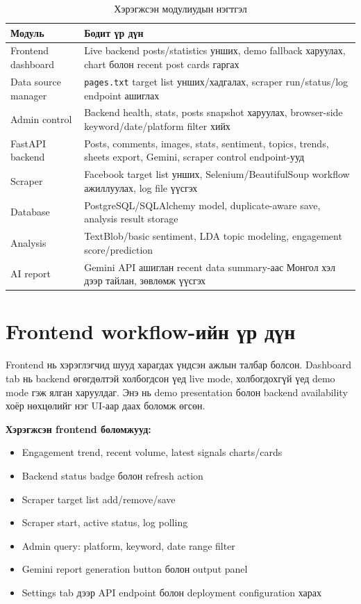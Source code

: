 \documentclass[
12pt,
oneside,
english,
onehalfspacing,
nolistspacing,
headsepline,
]{MUST-Thesis}
\begin{document}
\begin{table}[H]
\centering
\caption{Хэрэгжсэн модулиудын нэгтгэл}
\small
\renewcommand{\arraystretch}{1.25}
\begin{adjustbox}{max width=\textwidth}
\begin{tabular}{|L{3.6cm}|L{9.8cm}|}
\hline
{}\textbf{Модуль} & \textbf{Бодит үр дүн} \\
\hline
Frontend dashboard & Live backend posts/statistics унших, demo fallback харуулах, chart болон recent post cards гаргах \\
\hline
Data source manager & \texttt{pages.txt} target list унших/хадгалах, scraper run/status/log endpoint ашиглах \\
\hline
Admin control & Backend health, stats, posts snapshot харуулах, browser-side keyword/date/platform filter хийх \\
\hline
FastAPI backend & Posts, comments, images, stats, sentiment, topics, trends, sheets export, Gemini, scraper control endpoint-ууд \\
\hline
Scraper & Facebook target list унших, Selenium/BeautifulSoup workflow ажиллуулах, log file үүсгэх \\
\hline
Database & PostgreSQL/SQLAlchemy model, duplicate-aware save, analysis result storage \\
\hline
Analysis & TextBlob/basic sentiment, LDA topic modeling, engagement score/prediction \\
\hline
AI report & Gemini API ашиглан recent data summary-аас Монгол хэл дээр тайлан, зөвлөмж үүсгэх \\
\hline
\end{tabular}
\end{adjustbox}
\normalsize
\end{table}

\section{Frontend workflow-ийн үр дүн}

Frontend нь хэрэглэгчид шууд харагдах үндсэн ажлын талбар болсон. Dashboard tab нь backend өгөгдөлтэй холбогдсон үед live mode, холбогдохгүй үед demo mode гэж ялган харуулдаг. Энэ нь demo presentation болон backend availability хоёр нөхцөлийг нэг UI-аар даах боломж өгсөн.

\textbf{Хэрэгжсэн frontend боломжууд:}
\begin{itemize}
    \item Engagement trend, recent volume, latest signals charts/cards
    \item Backend status badge болон refresh action
    \item Scraper target list add/remove/save
    \item Scraper start, active status, log polling
    \item Admin query: platform, keyword, date range filter
    \item Gemini report generation button болон output panel
    \item Settings tab дээр API endpoint болон deployment configuration харах
\end{itemize}
\end{document}

